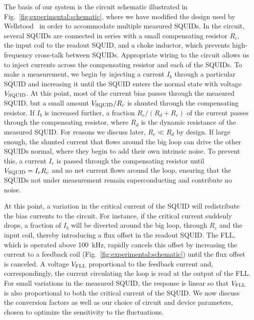 The basis of our system is the circuit schematic illustrated in Fig.~\ref{fig:experimental:schematic}, where we have modified the design used by Wellstood~\citep{Wellstood:thesis} in order to accommodate multiple measured SQUIDs. In the circuit, several SQUIDs are connected in series with a small compensating resistor $R_c$, the input coil to the readout SQUID, and a choke inductor, which prevents high-frequency cross-talk between SQUIDs. Appropriate wiring to the circuit allows us to inject currents across the compensating resistor and each of the SQUIDs. To make a measurement, we begin by injecting a current $I_b$ through a particular SQUID and increasing it until the SQUID enters the normal state with voltage $V_\text{SQUID}$. At this point, most of the current bias passes through the measured SQUID, but a small amount $V_\text{SQUID}/R_c$ is shunted through the compensating resistor. If $I_b$ is increased further, a fraction $R_c/(R_d+R_c)$ of the current passes through the compensating resistor, where $R_d$ is the dynamic resistance of the measured SQUID. For reasons we discuss later, $R_c \ll R_d$ by design. If large enough, the shunted current that flows around the big loop can drive the other SQUIDs normal, where they begin to add their own intrinsic noise. To prevent this, a current $I_r$ is passed through the compensating resistor until $V_\text{SQUID} = I_r R_c$ and no net current flows around the loop, ensuring that the SQUIDs not under measurement remain superconducting and contribute no noise.

At this point, a variation in the critical current of the SQUID will redistribute the bias currents to the circuit. For instance, if the critical current suddenly drops, a fraction of $I_b$ will be diverted around the big loop, through $R_c$ and the input coil, thereby introducing a flux offset in the readout SQUID. The FLL, which is operated above 100~kHz, rapidly cancels this offset by increasing the current to a feedback coil (Fig.~\ref{fig:experimental:schematic}) until the flux offset is canceled. A voltage $V_\text{FLL}$ proportional to the feedback current and, correspondingly, the current circulating the loop is read at the output of the FLL. For small variations in the measured SQUID, the response is linear so that $V_\text{FLL}$ is also proportional to both the critical current of the SQUID. We now discuss the conversion factors as well as our choice of circuit and device parameters, chosen to optimize the sensitivity to the fluctuations.

